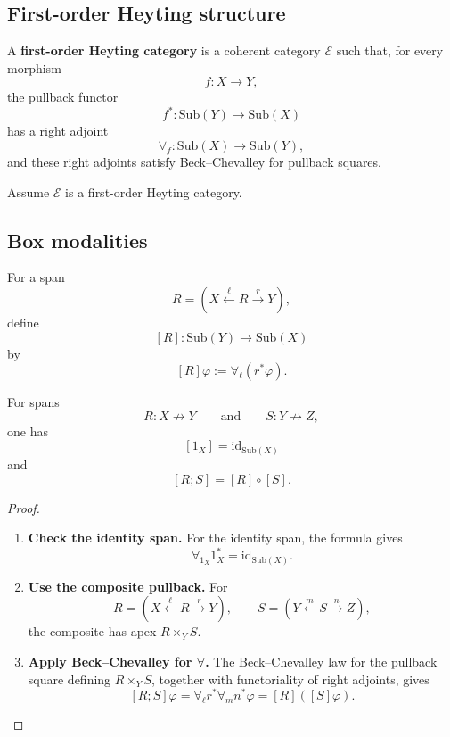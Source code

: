 \subsection{First-order Heyting structure}
\label{subsec:relative-first-order-heyting}

\begin{definition}
\label{def:relative-first-order-heyting}
A \textbf{first-order Heyting category} is a coherent category
\(\mathcal E\) such that, for every morphism
\[
f:X\to Y,
\]
the pullback functor
\[
f^\ast:\mathrm{Sub}(Y)\to\mathrm{Sub}(X)
\]
has a right adjoint
\[
\forall_f:\mathrm{Sub}(X)\to\mathrm{Sub}(Y),
\]
and these right adjoints satisfy Beck--Chevalley for pullback squares.
\end{definition}

Assume \(\mathcal E\) is a first-order Heyting category.

\subsection{Box modalities}
\label{subsec:relative-box-modalities}

\begin{definition}
\label{def:relative-span-box}
For a span
\[
R=
(X\xleftarrow{\ell}R\xrightarrow{r}Y),
\]
define
\[
[R]:\mathrm{Sub}(Y)\to\mathrm{Sub}(X)
\]
by
\[
[R]\varphi:=\forall_\ell(r^\ast\varphi).
\]
\end{definition}

\begin{proposition}
\label{prop:relative-box-functoriality}
For spans
\[
R:X\nrightarrow Y
\qquad\text{and}\qquad
S:Y\nrightarrow Z,
\]
one has
\[
[1_X]=\mathrm{id}_{\mathrm{Sub}(X)}
\]
and
\[
[R;S]=[R]\circ[S].
\]
\end{proposition}

\begin{proof}
\leavevmode
\begin{enumerate}
\item \textbf{Check the identity span.}
For the identity span, the formula gives
\[
\forall_{1_X}1_X^\ast=\mathrm{id}_{\mathrm{Sub}(X)}.
\]

\item \textbf{Use the composite pullback.}
For
\[
R=(X\xleftarrow{\ell}R\xrightarrow{r}Y),
\qquad
S=(Y\xleftarrow{m}S\xrightarrow{n}Z),
\]
the composite has apex \(R\times_Y S\).

\item \textbf{Apply Beck--Chevalley for \(\forall\).}
The Beck--Chevalley law for the pullback square defining \(R\times_Y S\),
together with functoriality of right adjoints, gives
\[
[R;S]\varphi
=
\forall_\ell r^\ast\forall_m n^\ast\varphi
=
[R]([S]\varphi).
\]
\end{enumerate}
\end{proof}

